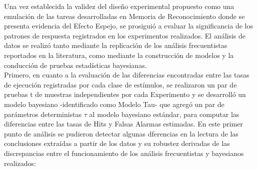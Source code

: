 \documentclass[jou,apacite]{apa6}
\begin{document}
Una vez establecida la validez del diseño experimental propuesto como una emulación de las tareas desarrolladas en Memoria de Reconocimiento donde se presenta evidencia del Efecto Espejo, se prosiguió a evaluar la significancia de los patrones de respuesta registrados en los experimentos realizados. El análisis de datos se realizó tanto mediante la replicación de los análisis frecuentistas reportados en la literatura, como mediante la construcción de modelos y la conducción de pruebas estadísticas bayesianas.\\

Primero, en cuanto a la evaluación de las diferencias encontradas entre las tasas de ejecución registradas por cada clase de estímulos, se realizaron un par de pruebas t de muestras independientes por cada Experimento y se desarrolló un modelo bayesiano -identificado como Modelo Tau- que agregó un par de parámetros deterministas $\tau$ al modelo bayesiano estándar, para computar las diferencias entre las tasas de Hits y Falsas Alarmas estimadas. En este primer punto de análisis se pudieron detectar algunas dferencias en la lectura de las conclusiones extraídas a partir de los datos y su robustez derivadas de las discrepancias entre el funcionamiento de los análisis frecuentistas y bayesianos realizados:\\
\end{document}
